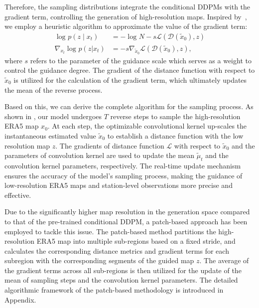 Therefore, the sampling distributions integrate the conditional DDPMs with the gradient term, controlling the generation of high-resolution maps.
Inspired by~\cite{fei2023generative}, we employ a heuristic algorithm to approximate the value of the gradient term:
\begin{align}
\log_{}{ p(z\mid x_{t})}&=- \log_{}{N}-s\mathcal{L}( \mathcal{D}(\tilde{x}_0),z)\\
\nabla _{x_t}\log_{}{p(z|x_t)}&=-s\nabla_{\tilde{x}_0}\mathcal{L}(\mathcal{D}(\tilde{x}_0),z),
\end{align}
where $s$ refers to the parameter of the guidance scale which serves as a weight to control the guidance degree.
The gradient of the distance function with respect to $\tilde{x}_0$ is utilized for the calculation of the gradient term, which ultimately updates the mean of the reverse process. 

Based on this, we can derive the complete algorithm for the sampling process.
As shown in , our model undergoes $T$ reverse steps to sample the high-resolution ERA5 map $x_0$. 
At each step, the optimizable convolutional kernel up-scales the instantaneous estimated value $\tilde{x}_0$ to establish a distance function with the low resolution map $z$.
The gradients of distance function $\mathcal{L}$ with respect to $\tilde{x}_0$ and the parameters of convolution kernel are used to update the mean $\tilde{\mu}_t$ and the convolution kernel parameters, respectively. 
The real-time update mechanism ensures the accuracy of the model's sampling process, making the guidance of low-resolution ERA5 maps and station-level observations more precise and effective. 

Due to the significantly higher map resolution in the generation space compared to that of the pre-trained conditional DDPM, a patch-based approach has been employed to tackle this issue. 
The patch-based method partitions the high-resolution ERA5 map into multiple sub-regions based on a fixed stride, and calculates the corresponding distance metrics and gradient terms for each subregion with the corresponding segments of the guided map $z$. 
The average of the gradient terms across all sub-regions is then utilized for the update of the mean of sampling steps and the convolution kernel parameters. 
The detailed algorithmic framework of the patch-based methodology is introduced in Appendix. 


